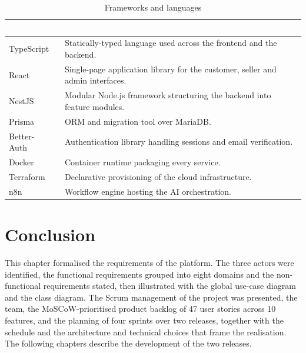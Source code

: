 \begin{table}[H]
  \centering
  \caption{Frameworks and languages}
  \label{tab:frameworks}
  \begin{tabularx}{\textwidth}{|l|X|}
    \hline
    \rowcolor{tableHeader}
    \textcolor{white}{\textbf{Technology}} & \textcolor{white}{\textbf{Role}} \\
    \hline
    TypeScript~\cite{typescript}  & Statically-typed language used across the frontend and the backend. \\ \hline
    React~\cite{react}            & Single-page application library for the customer, seller and admin interfaces. \\ \hline
    NestJS~\cite{nestjs}          & Modular Node.js framework structuring the backend into feature modules. \\ \hline
    Prisma~\cite{prisma}          & ORM and migration tool over MariaDB. \\ \hline
    Better-Auth~\cite{betterauth} & Authentication library handling sessions and email verification. \\ \hline
    Docker        & Container runtime packaging every service. \\ \hline
    Terraform     & Declarative provisioning of the cloud infrastructure. \\ \hline
    n8n           & Workflow engine hosting the AI orchestration. \\ \hline
  \end{tabularx}
\end{table}

\section*{Conclusion}

This chapter formalised the requirements of the platform. The three
actors were identified, the functional requirements grouped into eight
domains and the non-functional requirements stated, then illustrated
with the global use-case diagram and the class diagram. The Scrum
management of the project was presented, the team, the MoSCoW-prioritised
product backlog of 47 user stories across 10 features, and the planning
of four sprints over two releases, together with the schedule and the
architecture and technical choices that frame the realisation. The
following chapters describe the development of the two releases.
